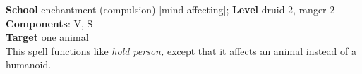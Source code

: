 \textbf{School} enchantment (compulsion) [mind-affecting]; \textbf{Level} druid 2, ranger 2\\
\textbf{Components}: V, S\\
\textbf{Target} one animal\\
This spell functions like \textit{hold person, }except that it affects an animal instead of a humanoid.\\
